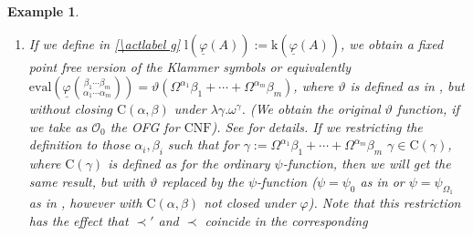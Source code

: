 \documentclass[10pt]{article}
\def \ssubitem#1{\item \label{\actlabel#1} }
\def \refsub#1#2{\ref{#1#2}}                    %
\def \refact#1{\ref{\actlabel#1}}               %
\newtheorem {example}[lemma]{Example}
\def\all{\forall}
\def \calO{{\mathcal O}}
\def\k{\mathrm{k}}
\def\lrm{\mathrm{l}}
\def\eval{\mathrm{eval}}
\def\phibar{{\underline{\varphi}}}
\def\CNF{\mathrm{CNF}}
\def\C{\mathrm{C}}
\begin{document}
\begin{example}
{\begin{enumerate}
Then $\eval(\phibar(A)) = \varphi(A)$,
where $\varphi(A)$ is defined as in \cite{Schuette54}, based
on $\varphi(\alpha):= \omega^\alpha$, but
with reversed order of the columns. We prove this by 
induction on $<'_\calO$:\\ 
If $A = \phibar(\alpha,0)$, then we can easily show
$\eval(A) = \omega^\alpha= \varphi(\alpha,0)$.\\ 
If $A= \phibar(B,\alpha,\beta,\gamma,0)$, then it follows that 
$\C(\phibar(A))$ is closed under $+$,\\
$\lambda \delta.\eval(\phibar(B,\alpha^\ast,\beta,\delta,\beta^\ast))$
for $\alpha^\ast<\alpha$, $\beta^\ast<\beta$ and 
contains further\\ 
$\eval(\phibar(B,\alpha,\beta,\gamma^\ast,0))$ for $\gamma^\ast<\gamma$,
therefore using the IH 
$\eval(\phibar(B,\alpha,\beta,\gamma,0))\geq \varphi(B,\alpha,\beta,\gamma,0)$.
On the other hand, $\varphi(A) \geq \k(\phibar(A))$,
$\varphi(A)> \lrm(\phibar(A))$, and, if $B <' A$, $\k(\phibar(B))< 
\varphi(A)$, 
by the calculations in \cite{Schuette54}
$\varphi(B) < \varphi(A)$, therefore  using the IH
$\all \gamma \in \C(\phibar(A))(\gamma < \varphi(A))$, 
$\varphi(A) \geq \eval(\phibar(A))$.
\ssubitem h If we define in \refact g $\lrm(\phibar(A)):= \k(\phibar(A))$,
we obtain a fixed point free version of the 
Klammer symbols or equivalently
$\eval(\phibar 
{\binom{\beta_1 \cdots \beta_m}{\alpha_1 \cdots \alpha_m}})= 
\vartheta(\Omega^{\alpha_1}\beta_1 +\cdots+ \Omega^{\alpha_m}\beta_m)$,
where $\vartheta$ is defined as in \cite{rathjenweiermann}, but
without closing $\C(\alpha,\beta)$ under $\lambda \gamma.\omega^\gamma$.
(We obtain the original $\vartheta$ function, if we take as
$\calO_0$ the OFG for $\CNF$). See \cite{seisenbdipl} for details.
If we restricting the definition to those $\alpha_i,\beta_i$ such that
for $\gamma:= \Omega^{\alpha_1}\beta_1 +\cdots+ \Omega^{\alpha_m}\beta_m$
$\gamma \in \C(\gamma)$, where $\C(\gamma)$ is defined as for the 
ordinary $\psi$-function, 
then we will get the same result, but with $\vartheta$ replaced
by the $\psi$-function ($\psi = \psi_0$ as in \cite{buchholzanewsys}
or $\psi= \psi_{\Omega_1}$ as in \cite{buchholzasimplified}, 
however with $\C(\alpha,\beta)$ not closed under $\varphi$).
Note that this restriction has the effect that 
$\prec'$ and $\prec$ coincide in the corresponding

\end{enumerate}}
\end{example}
\end{document}
